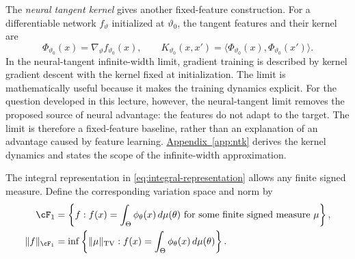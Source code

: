 \documentclass[11pt,twoside]{article}
\newcommand{\appendixref}[1]{\hyperref[#1]{Appendix~\ref*{#1}}}
\newcommand{\TV}{\operatorname{TV}}
\theoremstyle{definition}
\theoremstyle{remark}
\begin{document}
The \emph{neural tangent kernel} gives another fixed-feature construction.
For a differentiable network \(f_\vartheta\) initialized at \(\vartheta_0\),
the tangent features and their kernel are
\begin{equation}
 \Phi_{\vartheta_0}(x)=\nabla_\vartheta f_{\vartheta_0}(x),
 \qquad
 K_{\vartheta_0}(x,x')
 =\langle\Phi_{\vartheta_0}(x),\Phi_{\vartheta_0}(x')\rangle.
 \label{eq:main-ntk}
\end{equation}
In the neural-tangent infinite-width limit, gradient training is described by
kernel gradient descent with the kernel fixed at initialization. The limit is
mathematically useful because it makes the training dynamics explicit. For
the question developed in this lecture, however, the neural-tangent limit
removes the proposed source of neural advantage: the features do not adapt to
the target. The limit is therefore a fixed-feature baseline, rather than an
explanation of an advantage caused by feature learning.
\appendixref{app:ntk} derives the kernel dynamics and states the scope of the
infinite-width approximation.

The integral representation in \cref{eq:integral-representation} allows any
finite signed measure. Define the corresponding variation space and norm by
\begin{align}
 \cF_1
 &=\left\{f:f(x)=\int_\Theta\phi_\theta(x)\,d\mu(\theta)
             \text{ for some finite signed measure }\mu\right\},
 \notag\\
 \|f\|_{\cF_1}
 &=\inf\left\{\|\mu\|_{\TV}:
       f(x)=\int_\Theta\phi_\theta(x)\,d\mu(\theta)\right\}.
 \label{eq:F1}
\end{align}
\end{document}
